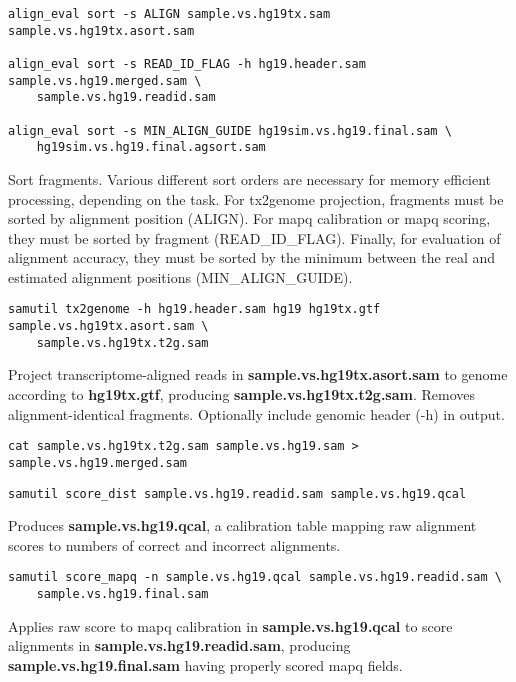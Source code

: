 \documentclass[10pt]{article}
\begin{document}
{\small
\begin{verbatim}
align_eval sort -s ALIGN sample.vs.hg19tx.sam sample.vs.hg19tx.asort.sam

align_eval sort -s READ_ID_FLAG -h hg19.header.sam sample.vs.hg19.merged.sam \
    sample.vs.hg19.readid.sam

align_eval sort -s MIN_ALIGN_GUIDE hg19sim.vs.hg19.final.sam \
    hg19sim.vs.hg19.final.agsort.sam
\end{verbatim}
}


Sort fragments.  Various different sort orders are necessary for
memory efficient processing, depending on the task. For tx2genome
projection, fragments must be sorted by alignment position
(ALIGN). For mapq calibration or mapq scoring, they must be sorted by
fragment (READ\_ID\_FLAG).  Finally, for evaluation of alignment
accuracy, they must be sorted by the minimum between the real and
estimated alignment positions (MIN\_ALIGN\_GUIDE).

{\small
\begin{verbatim}
samutil tx2genome -h hg19.header.sam hg19 hg19tx.gtf sample.vs.hg19tx.asort.sam \
    sample.vs.hg19tx.t2g.sam
\end{verbatim}
}


Project transcriptome-aligned reads in
\textbf{sample.vs.hg19tx.asort.sam} to genome according to
\textbf{hg19tx.gtf}, producing \textbf{sample.vs.hg19tx.t2g.sam}.
Removes alignment-identical fragments.  Optionally include genomic
header (-h) in output.

{\small
\begin{verbatim}
cat sample.vs.hg19tx.t2g.sam sample.vs.hg19.sam > sample.vs.hg19.merged.sam
\end{verbatim}
}


{\small
\begin{verbatim}
samutil score_dist sample.vs.hg19.readid.sam sample.vs.hg19.qcal
\end{verbatim}
}


Produces \textbf{sample.vs.hg19.qcal}, a calibration table mapping raw
alignment scores to numbers of correct and incorrect alignments.

{\small
\begin{verbatim}
samutil score_mapq -n sample.vs.hg19.qcal sample.vs.hg19.readid.sam \
    sample.vs.hg19.final.sam
\end{verbatim}
}


Applies raw score to mapq calibration in \textbf{sample.vs.hg19.qcal}
to score alignments in \-\textbf{sample.vs.hg19.readid.sam}, producing
\textbf{sample.vs.hg19.final.sam} having properly scored mapq fields.
\end{document}
